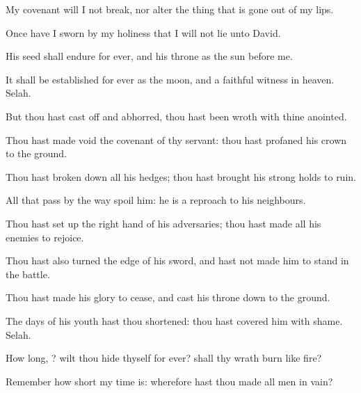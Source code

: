 {\par }{\Q {}My
covenant will I not
break, nor
alter the thing that is gone
out of my
lips.


\par }{\Q {}Once have I
sworn by my
holiness that I will not
lie unto
David.


\par }{\Q {}His
seed shall endure for
ever, and his
throne as the
sun before me.


\par }{\Q {}It shall be
established for
ever as the
moon, and
{} a
faithful
witness in
heaven.
Selah.


\par }{\BB \par }
{\Q {}But thou hast cast
off and
abhorred, thou hast been
wroth with thine
anointed.


\par }{\Q {}Thou hast made
void the
covenant of thy
servant: thou hast
profaned his
crown
{} to the
ground.


\par }{\Q {}Thou hast broken
down all his
hedges; thou hast
brought his strong
holds to
ruin.


\par }{\Q {}All that pass
by the
way
spoil him: he is a
reproach to his
neighbours.


\par }{\Q {}Thou hast set
up the right
hand of his
adversaries; thou hast made all his
enemies to
rejoice.


\par }{\Q {}Thou hast also
turned the
edge of his
sword, and hast not made him to
stand in the
battle.


\par }{\Q {}Thou hast made his
glory to
cease, and
cast his
throne
down to the
ground.


\par }{\Q {}The
days of his
youth hast thou
shortened: thou hast
covered him with
shame.
Selah.


\par }{\Q {}How long,
{}? wilt thou
hide thyself for
ever? shall thy
wrath
burn like
fire?


\par }{\Q {}Remember how
short my time is: wherefore hast thou
made all
men in
vain?


}
